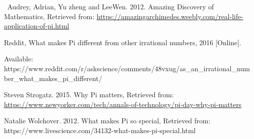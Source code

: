 \documentclass[12pt]{article}
\begin{document}
{\fontsize{10pt}{12.0pt}\selectfont [3]\ Audrey, Adrian, Yu zheng and LeeWen. 2012. Amazing Discovery of Mathematics, Retrieved from:  \href{https://amazingarchimedes.weebly.com/real-life-application-of-pi.html}{https://amazingarchimedes.weebly.com/real-life-application-of-pi.html}\par}\par

{\fontsize{10pt}{12.0pt}\selectfont [4] Reddit, What makes Pi different from other irrational numbers, 2016 [Online]. \par}\par

{\fontsize{9pt}{10.8pt}\selectfont Available: https://www.reddit.com/r/askscience/comments/48vxug/as\_an\_irrational\_number\_what\_makes\_pi\_different/\par}\par

{\fontsize{10pt}{12.0pt}\selectfont [5] Steven Strogatz. 2015. Why Pi matters, Retrieved from: \href{https://www.newyorker.com/tech/annals-of-technology/pi-day-why-pi-matters}{https://www.newyorker.com/tech/annals-of-technology/pi-day-why-pi-matters}\par}\par

{\fontsize{10pt}{12.0pt}\selectfont [6] Natalie Wolchover. 2012. What makes Pi so special, Retrieved from: https://www.livescience.com/34132-what-makes-pi-special.html\par}\par


\vspace{\baselineskip}
\begin{justify}
 
\end{justify}\par


\vspace{\baselineskip}

\vspace{\baselineskip}

\vspace{\baselineskip}

\vspace{\baselineskip}

\printbibliography
\end{document}
